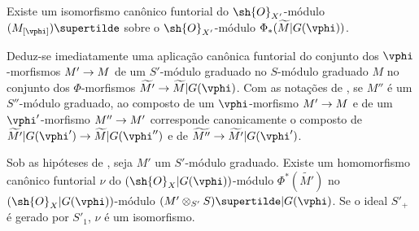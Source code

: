 \documentclass[oneside,10pt]{amsart}
\makeatletter
\newcommand{\ega@arrow}[2]{\mathchoice{#1}{#2}{#2}{#2}}
\renewcommand{\to}{\ega@arrow{\longrightarrow}{\rightarrow}}
\let\EGAOriginalLabel\label
\renewcommand{\label}[1]{\phantomsection\EGAOriginalLabel{#1}}
\makeatother
\begin{document}
\begin{proposition}[2.8.7]
\label{II.2.8.7}
Existe um isomorfismo canônico funtorial do $\sh{O}_{X'}$-módulo $(M_{[\vphi]})\supertilde$ sobre o $\sh{O}_{X'}$-módulo $\Phi_*(\widetilde{M}|G(\vphi))$.
\end{proposition}

Deduz-se imediatamente uma aplicação canônica funtorial do conjunto dos $\vphi$-morfismos $M'\to M$ de um $S'$-módulo graduado no $S$-módulo graduado $M$ no conjunto dos $\Phi$-morfismos $\widetilde{M'}\to\widetilde{M}|G(\vphi)$.
Com as notações de , se $M''$ é um $S''$-módulo graduado, ao composto de um $\vphi$-morfismo $M'\to M$ e de um $\vphi'$-morfismo $M''\to M'$ corresponde canonicamente o composto de $\widetilde{M'}|G(\vphi')\to\widetilde{M}|G(\vphi'')$ e de $\widetilde{M''}\to\widetilde{M'}|G(\vphi')$.

\begin{proposition}[2.8.8]
\label{II.2.8.8}
Sob as hipóteses de , seja $M'$ um $S'$-módulo graduado.
Existe um homomorfismo canônico funtorial $\nu$ do $(\sh{O}_X|G(\vphi))$-módulo $\Phi^*(\widetilde{M'})$ no $(\sh{O}_X|G(\vphi))$-módulo $(M'\otimes_{S'}S)\supertilde|G(\vphi)$.
Se o ideal $S'_+$ é gerado por $S'_1$, $\nu$ é um isomorfismo.
\end{proposition}
\end{document}
